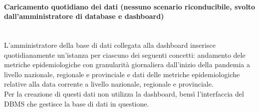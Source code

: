 \paragraph{Caricamento quotidiano dei dati (nessuno scenario riconducibile, svolto dall'amministratore di database e dashboard)}\mbox{}\\
L'amministratore della base di dati collegata alla dashboard inserisce quotidianamente un'istanza per ciascuno dei seguenti concetti: andamento dele metriche epidemiologiche con granularità giornaliera dall'inizio della pandemia a livello nazionale, regionale e provinciale e dati delle metriche epidemiologiche relative alla data corrente a livello nazionale, regionale e provinciale.\\
Per la creazione di questi dati non utilizza la dashboard, bensì l'interfaccia del DBMS che gestisce la base di dati in questione.